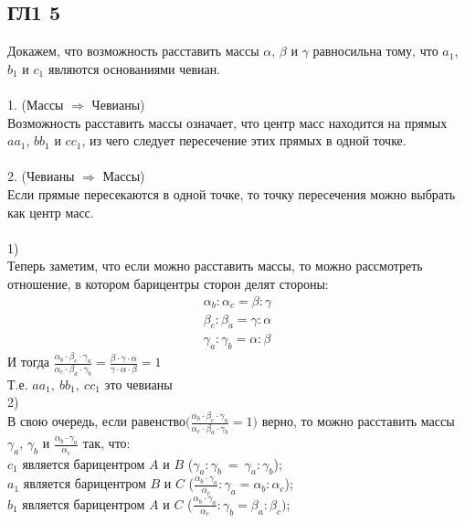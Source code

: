 		 \subsection{ГЛ1 5}
		 Докажем, что возможность расставить массы $\alpha$, $\beta$ и $\gamma$ равносильна тому, что $a_1$, $b_1$ и $c_1$ являются основаниями чевиан.\\
		 \\
		 1. (Массы $\Rightarrow$ Чевианы) \\
		 Возможность расставить массы означает, что центр масс находится на прямых $a a_1$, $b b_1$ и $c c_1$, из чего следует пересечение этих прямых в одной точке.\\
		 \\	 
		 2. (Чевианы $\Rightarrow$ Массы) \\
		 Если прямые пересекаются в одной точке, то точку пересечения можно выбрать как центр масс.\\
		 \\		 
		 1)\\
		 Теперь заметим, что если можно расставить массы, то можно рассмотреть отношение, в котором барицентры сторон делят стороны:
		 \begin{gather*}
		 \alpha_b : \alpha_c = \beta : \gamma\\
		 \beta_c : \beta_a = \gamma : \alpha\\
		 \gamma_a : \gamma_b = \alpha : \beta
		 \end{gather*}
		 И тогда $\frac{\alpha_b \cdot \beta_c \cdot \gamma_a}{\alpha_c \cdot \beta_a \cdot \gamma_b} = \frac{\beta \cdot \gamma \cdot \alpha}{\gamma \cdot \alpha \cdot \beta} = 1$\\
		 Т.е. $aa_1,\: bb_1,\: cc_1$ это чевианы
		 \\
		 2)\\
		 В свою очередь, если равенство$\biggl( \frac{\alpha_b \cdot \beta_c \cdot \gamma_a}{\alpha_c \cdot \beta_a \cdot \gamma_b} = 1 \biggl)$ верно, то можно расставить массы
		 $\gamma_a$, $\gamma_b$ и $\frac{\alpha_b \cdot \gamma_a}{\alpha_c}$ так, что:\\
		 $c_1$ является барицентром $A$ и $B$ ($\gamma_a : \gamma_b \: = \: \gamma_a : \gamma_b$);\\
		 $a_1$ является барицентром $B$ и $C$ ($\frac{\alpha_b \cdot \gamma_a}{\alpha_c} : \gamma_a = \alpha_b : \alpha_c$);\\
		 $b_1$ является барицентром $A$ и $C$ ($\frac{\alpha_b \cdot \gamma_a}{\alpha_c} : \gamma_b = \beta_a : \beta_c)$;\\
